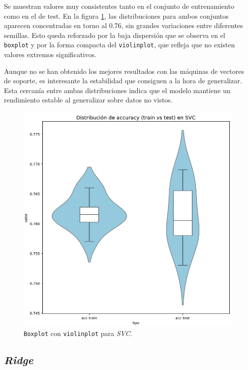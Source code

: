 Se muestran valores muy consistentes tanto en el conjunto de entrenamiento como en el de test. En la figura \ref{fig:svm_bin}, las distribuciones para ambos conjuntos aparecen concentradas en torno al 0.76, sin grandes variaciones entre diferentes semillas. Esto queda reforzado por la baja dispersión que se observa en el \texttt{boxplot} y por la forma compacta del \texttt{violinplot}, que refleja que no existen valores extremos significativos.

\vspace{1em}

Aunque no se han obtenido los mejores resultados con las máquinas de vectores de soporte, es interesante la estabilidad que consiguen a la hora de generalizar. Esta cercanía entre ambas distribuciones indica que el modelo mantiene un rendimiento estable al generalizar sobre datos no vistos.

\begin{figure}[H]
	\centering
	\includegraphics[width=1\linewidth]{Imagenes/svm_bin}
	\caption[\texttt{Boxplot} con \texttt{violinplot} para \textit{SVC}]{\texttt{Boxplot} con \texttt{violinplot} para \textit{SVC}.}
	\label{fig:svm_bin}
\end{figure}

\newpage
\subsection{\textit{Ridge}}
\label{subsec:ridge_bin}

